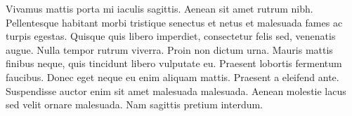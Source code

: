 Vivamus mattis porta mi iaculis sagittis. Aenean sit amet rutrum nibh. Pellentesque habitant morbi tristique senectus et netus et malesuada fames ac turpis egestas. Quisque quis libero imperdiet, consectetur felis sed, venenatis augue. Nulla tempor rutrum viverra. Proin non dictum urna. Mauris mattis finibus neque, quis tincidunt libero vulputate eu. Praesent lobortis fermentum faucibus. Donec eget neque eu enim aliquam mattis. Praesent a eleifend ante. Suspendisse auctor enim sit amet malesuada malesuada. Aenean molestie lacus sed velit ornare malesuada. Nam sagittis pretium interdum.